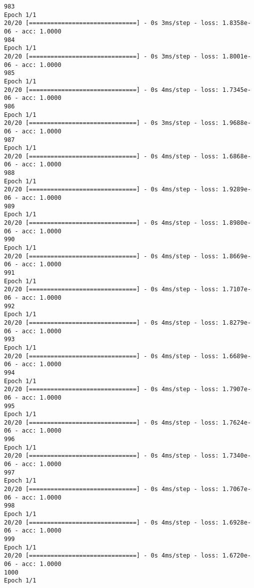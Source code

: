 \documentclass[11pt]{article}
\begin{document}
\begin{Verbatim}[commandchars=\\\{\}]
983
Epoch 1/1
20/20 [==============================] - 0s 3ms/step - loss: 1.8358e-06 - acc: 1.0000
984
Epoch 1/1
20/20 [==============================] - 0s 3ms/step - loss: 1.8001e-06 - acc: 1.0000
985
Epoch 1/1
20/20 [==============================] - 0s 4ms/step - loss: 1.7345e-06 - acc: 1.0000
986
Epoch 1/1
20/20 [==============================] - 0s 3ms/step - loss: 1.9688e-06 - acc: 1.0000
987
Epoch 1/1
20/20 [==============================] - 0s 4ms/step - loss: 1.6868e-06 - acc: 1.0000
988
Epoch 1/1
20/20 [==============================] - 0s 4ms/step - loss: 1.9289e-06 - acc: 1.0000
989
Epoch 1/1
20/20 [==============================] - 0s 4ms/step - loss: 1.8980e-06 - acc: 1.0000
990
Epoch 1/1
20/20 [==============================] - 0s 4ms/step - loss: 1.8669e-06 - acc: 1.0000
991
Epoch 1/1
20/20 [==============================] - 0s 4ms/step - loss: 1.7107e-06 - acc: 1.0000
992
Epoch 1/1
20/20 [==============================] - 0s 4ms/step - loss: 1.8279e-06 - acc: 1.0000
993
Epoch 1/1
20/20 [==============================] - 0s 4ms/step - loss: 1.6689e-06 - acc: 1.0000
994
Epoch 1/1
20/20 [==============================] - 0s 4ms/step - loss: 1.7907e-06 - acc: 1.0000
995
Epoch 1/1
20/20 [==============================] - 0s 4ms/step - loss: 1.7624e-06 - acc: 1.0000
996
Epoch 1/1
20/20 [==============================] - 0s 4ms/step - loss: 1.7340e-06 - acc: 1.0000
997
Epoch 1/1
20/20 [==============================] - 0s 4ms/step - loss: 1.7067e-06 - acc: 1.0000
998
Epoch 1/1
20/20 [==============================] - 0s 4ms/step - loss: 1.6928e-06 - acc: 1.0000
999
Epoch 1/1
20/20 [==============================] - 0s 4ms/step - loss: 1.6720e-06 - acc: 1.0000
1000
Epoch 1/1

    \end{Verbatim}
\end{document}
